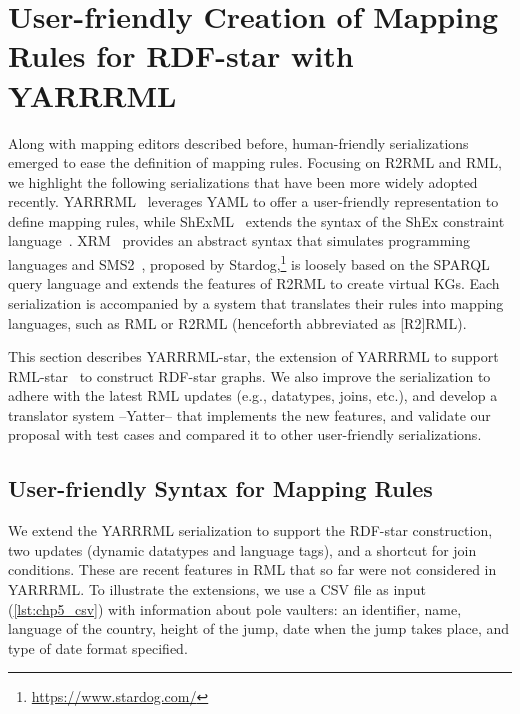 \section{User-friendly Creation of Mapping Rules for RDF-star with YARRRML}
\label{sec:chp5_yarrrml_star}

Along with mapping editors described before, human-friendly serializations emerged 
to ease the definition of mapping rules. Focusing on R2RML and RML, we highlight the following serializations that have been more widely adopted recently.
YARRRML~\parencite{Heyvaert2018yarrrml} leverages YAML
to offer a user-friendly representation to define mapping rules, while
ShExML~\parencite{Garcia-Gonzalez2020shexml} extends the syntax of the ShEx constraint language~\parencite{prud2014shex}.
XRM~\parencite{xrm}
provides an abstract syntax that simulates programming languages and 
SMS2~\parencite{sms2}, proposed by Stardog,\footnote{\label{foot:stardog}\url{https://www.stardog.com/}} is loosely based on the SPARQL query language and extends the features of R2RML to create virtual KGs.
Each serialization is accompanied by a system that translates their rules into mapping languages, such as RML or R2RML (henceforth abbreviated as [R2]RML). 

This section describes YARRRML-star, the extension of YARRRML to support RML-star~\parencite{delva2021rml-star} to construct RDF-star graphs.
We also improve the serialization to adhere with the latest RML updates
(e.g., datatypes, joins, etc.), and develop a translator system --Yatter-- that implements the new features, and validate our proposal with test cases and compared it to other user-friendly serializations.

\subsection{User-friendly Syntax for Mapping Rules}
\label{sec:chp5_yarrrml-desc}
We extend the YARRRML serialization to support the RDF-star construction, two updates (dynamic datatypes and language tags), and a shortcut for join conditions. These are recent features in RML that so far were not considered in YARRRML.
To illustrate the extensions,
we use a CSV file as input (\cref{lst:chp5_csv}) with information about pole vaulters: an identifier, name, language of the country, height of the jump, date when the jump takes place, and type of date format specified.

